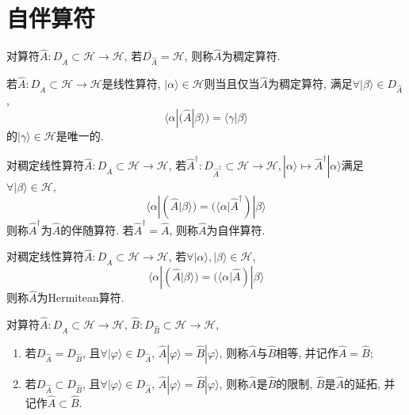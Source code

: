 \chapter{自伴算符}

\def\H{\mathcal{H}}

\begin{definition}
    对算符$\hat{A}: D_{\hat{A}}\subset\H\to\H$, 若$\overline{{D}_{\hat{A}}}=\H$, 则称$\hat{A}$为稠定算符.
\end{definition}

\begin{theorem}
    若$\hat{A}: D_{\hat{A}}\subset\H\to\H$是线性算符, $|\alpha\rangle\in\H$则当且仅当$\hat{A}$为稠定算符, 满足$\forall|\beta\rangle\in D_{\hat{A}}$,
    \begin{equation*}
        \langle\alpha|(\hat{A}|\beta\rangle)=\langle\gamma|\beta\rangle
    \end{equation*}
    的$|\gamma\rangle\in\H$是唯一的.
\end{theorem}

\begin{definition}
    对稠定线性算符$\hat{A}: D_{\hat{A}}\subset\H\to\H$, 若$\hat{A}^{\dagger} : D_{\hat{A}^{\dagger}}\subset\H\to\H, |\alpha\rangle\mapsto \hat{A}^{\dagger}|\alpha\rangle$满足$\forall|\beta\rangle\in\H$,
    \begin{equation*}
        \langle\alpha|(\hat{A}|\beta\rangle)=(\langle\alpha|\hat{A}^{\dagger})|\beta\rangle
    \end{equation*}
    则称$\hat{A}^{\dagger}$为$\hat{A}$的伴随算符. 若$\hat{A}^{\dagger}=\hat{A}$, 则称$\hat{A}$为自伴算符.
\end{definition}

\begin{definition}
    对稠定线性算符$\hat{A}: D_{\hat{A}}\subset\H\to\H$, 若$\forall|\alpha\rangle, |\beta\rangle\in\H$,
    \begin{equation*}
        \langle\alpha|(\hat{A}|\beta\rangle)=(\langle\alpha|\hat{A})|\beta\rangle
    \end{equation*}
    则称$\hat{A}$为Hermitean算符.
\end{definition}

\begin{definition}
    对算符$\hat{A}: D_{\hat{A}}\subset\H\to\H$, $\hat{B}: D_{\hat{B}}\subset\H\to\H$, 
    \begin{enumerate}
        \item 若$D_{\hat{A}}=D_{\hat{B}}$, 且$\forall|\varphi\rangle\in D_{\hat{A}}$, $\hat{A}|\varphi\rangle=\hat{B}|\varphi\rangle$, 则称$\hat{A}$与$\hat{B}$相等, 并记作$\hat{A}=\hat{B}$;
        \item 若$D_{\hat{A}}\subset D_{\hat{B}}$, 且$\forall|\varphi\rangle\in D_{\hat{A}}$, $\hat{A}|\varphi\rangle=\hat{B}|\varphi\rangle$, 则称$\hat{A}$是$\hat{B}$的限制, $\hat{B}$是$\hat{A}$的延拓, 并记作$\hat{A}\subset\hat{B}$.
    \end{enumerate}
\end{definition}

